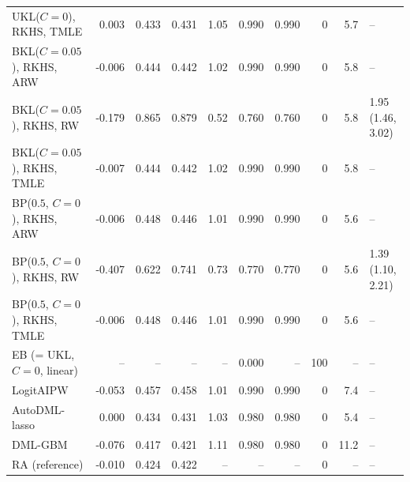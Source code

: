 \begin{tabular}{lrrrrrrrrl}
UKL($C=0$), RKHS, TMLE & 0.003 & 0.433 & 0.431 & 1.05 & 0.990 & 0.990 & 0 & 5.7 & -- \\
BKL($C=0.05$), RKHS, ARW & -0.006 & 0.444 & 0.442 & 1.02 & 0.990 & 0.990 & 0 & 5.8 & -- \\
BKL($C=0.05$), RKHS, RW & -0.179 & 0.865 & 0.879 & 0.52 & 0.760 & 0.760 & 0 & 5.8 & 1.95 (1.46, 3.02) \\
BKL($C=0.05$), RKHS, TMLE & -0.007 & 0.444 & 0.442 & 1.02 & 0.990 & 0.990 & 0 & 5.8 & -- \\
BP($0.5$, $C=0$), RKHS, ARW & -0.006 & 0.448 & 0.446 & 1.01 & 0.990 & 0.990 & 0 & 5.6 & -- \\
BP($0.5$, $C=0$), RKHS, RW & -0.407 & 0.622 & 0.741 & 0.73 & 0.770 & 0.770 & 0 & 5.6 & 1.39 (1.10, 2.21) \\
BP($0.5$, $C=0$), RKHS, TMLE & -0.006 & 0.448 & 0.446 & 1.01 & 0.990 & 0.990 & 0 & 5.6 & -- \\
EB (= UKL, $C=0$, linear) & -- & -- & -- & -- & 0.000 & -- & 100 & -- & -- \\
LogitAIPW & -0.053 & 0.457 & 0.458 & 1.01 & 0.990 & 0.990 & 0 & 7.4 & -- \\
AutoDML-lasso & 0.000 & 0.434 & 0.431 & 1.03 & 0.980 & 0.980 & 0 & 5.4 & -- \\
DML-GBM & -0.076 & 0.417 & 0.421 & 1.11 & 0.980 & 0.980 & 0 & 11.2 & -- \\
RA (reference) & -0.010 & 0.424 & 0.422 & -- & -- & -- & 0 & -- & -- \\
\hline
\end{tabular}
